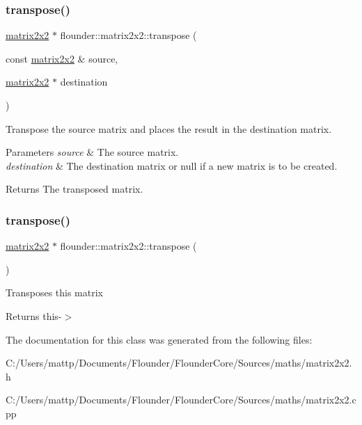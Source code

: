 \subsubsection{\texorpdfstring{transpose()}{transpose()}\hspace{0.1cm}{\footnotesize\ttfamily [1/2]}}
{\footnotesize\ttfamily \hyperlink{classflounder_1_1matrix2x2}{matrix2x2} $\ast$ flounder\+::matrix2x2\+::transpose (\begin{DoxyParamCaption}\item[{const \hyperlink{classflounder_1_1matrix2x2}{matrix2x2} \&}]{source,  }\item[{\hyperlink{classflounder_1_1matrix2x2}{matrix2x2} $\ast$}]{destination }\end{DoxyParamCaption})\hspace{0.3cm}{\ttfamily [static]}}



Transpose the source matrix and places the result in the destination matrix. 


\begin{DoxyParams}{Parameters}
{\em source} & The source matrix. \\
\hline
{\em destination} & The destination matrix or null if a new matrix is to be created. \\
\hline
\end{DoxyParams}
\begin{DoxyReturn}{Returns}
The transposed matrix. 
\end{DoxyReturn}
\mbox{\label{classflounder_1_1matrix2x2_ab2c07c15e39a1ab13270d88d7d83ee47}} 
\subsubsection{\texorpdfstring{transpose()}{transpose()}\hspace{0.1cm}{\footnotesize\ttfamily [2/2]}}
{\footnotesize\ttfamily \hyperlink{classflounder_1_1matrix2x2}{matrix2x2} $\ast$ flounder\+::matrix2x2\+::transpose (\begin{DoxyParamCaption}{ }\end{DoxyParamCaption})}



Transposes this matrix 

\begin{DoxyReturn}{Returns}
this-\/$>$ 
\end{DoxyReturn}


The documentation for this class was generated from the following files\+:\begin{DoxyCompactItemize}
\item 
C\+:/\+Users/mattp/\+Documents/\+Flounder/\+Flounder\+Core/\+Sources/maths/matrix2x2.\+h\item 
C\+:/\+Users/mattp/\+Documents/\+Flounder/\+Flounder\+Core/\+Sources/maths/matrix2x2.\+cpp\end{DoxyCompactItemize}
